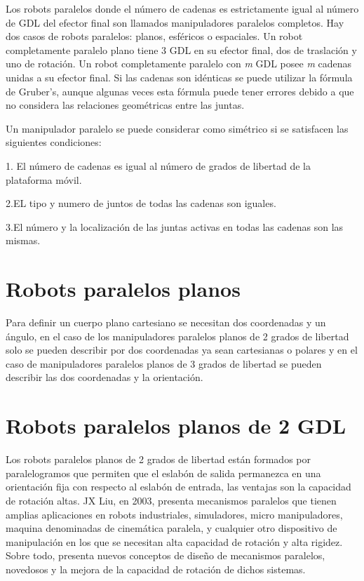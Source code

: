 \documentclass[11pt,a4paper,oldfontcommands,oneside]{memoir}
\begin{document}
Los robots paralelos donde el número de cadenas es estrictamente igual al número de GDL del efector final son llamados manipuladores paralelos completos. Hay dos casos de robots paralelos: planos, esféricos o espaciales. Un robot completamente paralelo plano tiene 3 GDL en su efector final, dos de traslación y uno de rotación. Un robot completamente paralelo con \textit{m} GDL posee \textit{m} cadenas unidas a su efector final. Si las cadenas son idénticas se puede utilizar la fórmula de Gruber's, aunque algunas veces esta fórmula puede tener errores debido a que no considera las relaciones geométricas entre las juntas.

Un manipulador paralelo se puede considerar como simétrico si se satisfacen las siguientes condiciones:

1. El número de cadenas es igual al número de grados de libertad de la plataforma móvil.

2.EL tipo y numero de juntos de todas las cadenas son iguales.

3.El número y la localización de las juntas activas en todas las cadenas son las mismas.

\section{Robots paralelos planos}

Para definir un cuerpo plano cartesiano se necesitan dos coordenadas y un ángulo, en el caso de los manipuladores paralelos planos de 2 grados de libertad solo se pueden describir por dos coordenadas ya sean cartesianas o polares y en el caso de manipuladores paralelos planos de 3 grados de libertad se pueden describir las dos coordenadas y la orientación.

\section{Robots paralelos planos de 2 GDL}

Los robots paralelos planos de 2 grados de libertad están formados por paralelogramos que permiten que el eslabón de salida permanezca en una orientación fija con respecto al eslabón de entrada, las ventajas son la capacidad de rotación altas. JX Liu, en 2003, presenta mecanismos paralelos que tienen amplias aplicaciones en robots industriales, simuladores, micro manipuladores, maquina denominadas de cinemática paralela, y cualquier otro dispositivo de manipulación en los que se necesitan alta capacidad de rotación y alta rigidez. Sobre todo, presenta nuevos conceptos de diseño de mecanismos paralelos, novedosos y la mejora de la capacidad de rotación de dichos sistemas.
\end{document}
